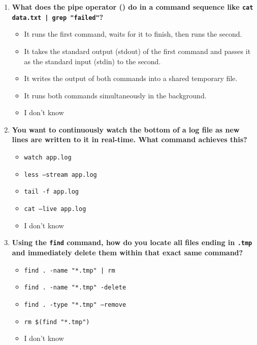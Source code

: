 \begin{appendix}
\begin{enumerate}
    \item \textbf{What does the pipe operator (\textbar) do in a command sequence like \texttt{cat data.txt | grep "failed"}?}
    \begin{itemize}
        \item[\textbf{A)}] It runs the first command, waits for it to finish, then runs the second.
        \item[\textbf{B)}] It takes the standard output (stdout) of the first command and passes it as the standard input (stdin) to the second.
        \item[\textbf{C)}] It writes the output of both commands into a shared temporary file.
        \item[\textbf{D)}] It runs both commands simultaneously in the background.
        \item[\textbf{E)}] I don't know
    \end{itemize}

    \item \textbf{You want to continuously watch the bottom of a log file as new lines are written to it in real-time. What command achieves this?}
    \begin{itemize}
        \item[\textbf{A)}] \texttt{watch app.log}
        \item[\textbf{B)}] \texttt{less --stream app.log}
        \item[\textbf{C)}] \texttt{tail -f app.log}
        \item[\textbf{D)}] \texttt{cat --live app.log}
        \item[\textbf{E)}] I don't know
    \end{itemize}

    \item \textbf{Using the \texttt{find} command, how do you locate all files ending in \texttt{.tmp} and immediately delete them within that exact same command?}
    \begin{itemize}
        \item[\textbf{A)}] \texttt{find . -name "*.tmp" | rm}
        \item[\textbf{B)}] \texttt{find . -name "*.tmp" -delete}
        \item[\textbf{C)}] \texttt{find . -type "*.tmp" --remove}
        \item[\textbf{D)}] \texttt{rm \$(find "*.tmp")}
        \item[\textbf{E)}] I don't know
    \end{itemize}


\end{enumerate}
\end{appendix}
